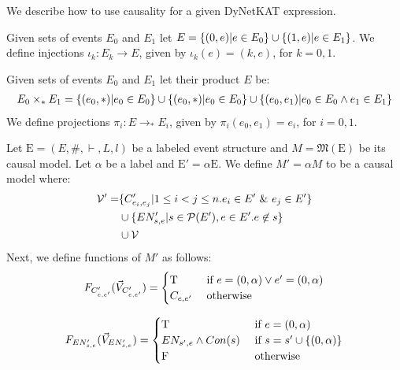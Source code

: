 We describe how to use causality for a given DyNetKAT expression.

\begin{definition}
    Given sets of events $E_0$ and $E_1$ let
    $E = \{(0,e)|e \in E_0\} \cup \{(1,e)|e \in E_1\}$.
    We define injections $\iota_k: E_k \rightarrow E$, given by
    $\iota_k(e) = (k,e)$, for $k = 0,1$.
\end{definition}

\begin{definition}
    Given sets of events $E_0$ and $E_1$ let their product $E$ be:
    \begin{align*}
        E_0 \times_* E_1 = \{(e_0,*)|e_0 \in E_0\} \cup \{(e_0,*)|e_0 \in E_0\}
        \cup \{(e_0,e_1)|e_0 \in E_0 \wedge e_1 \in E_1\}
    \end{align*}
    We define projections $\pi_i: E \rightarrow_* E_i$, given by
    $\pi_i(e_0,e_1) = e_i$, for $i=0,1$.
\end{definition}

\begin{definition}
    Let $\mathrm{E} = (E,\#,\vdash,L,l)$ be a labeled event structure and
    $M = \mathfrak{M}(\mathrm{E})$ be its causal model.
    Let $\alpha$ be a label and $\mathrm{E'} = \alpha \mathrm{E}$.
    We define $M' = \alpha M$ to be a causal model where:
    \begin{align*}
        \mathcal{V'} = & \{C'_{e_i,e_j} |  1 \leq i < j \leq n.
        e_i \in E' \ \& \  e_j \in E'\}                                 \\
                       & \cup \{EN'_{s,e} | s \in \mathcal{P}(E'),
        e \in E'. e \not \in s \}                                    \\
                       & \cup \mathcal{V}
    \end{align*}
    Next, we define functions of $M'$ as follows:
    $$
        F_{C'_{e,e'}}(\vec V_{C'_{e,e'}}) = \begin{cases}
            \mathrm{T}       & \text{ if } e = (0,\alpha) \vee e' = (0,\alpha) \\
            C_{e,e'} & \text{ otherwise }
        \end{cases}
    $$

    $$
        F_{EN'_{s,e}}(\vec V_{EN'_{s,e}}) = \begin{cases}
            \mathrm{T}                      & \text{ if } e = (0,\alpha)             \\
            EN_{s',e} \wedge Con(s) & \text{ if } s = s' \cup \{(0,\alpha)\} \\
            \mathrm{F}                      & \text{ otherwise }
        \end{cases}
    $$
\end{definition}


